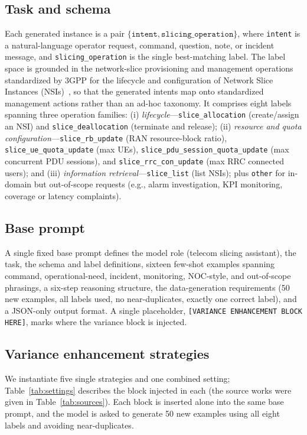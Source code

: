 \documentclass[conference]{IEEEtran}
\begin{document}
\subsection{Task and schema}
Each generated instance is a pair $\{\texttt{intent}, \texttt{slicing\_operation}\}$, where \texttt{intent} is a natural-language operator request, command, question, note, or incident message, and \texttt{slicing\_operation} is the single best-matching label. The label space is grounded in the network-slice provisioning and management operations standardized by 3GPP for the lifecycle and configuration of Network Slice Instances (NSIs)~\cite{3gpp28531}, so that the generated intents map onto standardized management actions rather than an ad-hoc taxonomy. It comprises eight labels spanning three operation families: (i) \emph{lifecycle}---\texttt{slice\_allocation} (create/assign an NSI) and \texttt{slice\_deallocation} (terminate and release); (ii) \emph{resource and quota configuration}---\texttt{slice\_rb\_update} (RAN resource-block ratio), \texttt{slice\_ue\_quota\_update} (max UEs), \texttt{slice\_pdu\_session\_quota\_update} (max concurrent PDU sessions), and \texttt{slice\_rrc\_con\_update} (max RRC connected users); and (iii) \emph{information retrieval}---\texttt{slice\_list} (list NSIs); plus \texttt{other} for in-domain but out-of-scope requests (e.g., alarm investigation, KPI monitoring, coverage or latency complaints).

\subsection{Base prompt}
A single fixed base prompt defines the model role (telecom slicing assistant), the task, the schema and label definitions, sixteen few-shot examples spanning command, operational-need, incident, monitoring, NOC-style, and out-of-scope phrasings, a six-step reasoning structure, the data-generation requirements (50 new examples, all labels used, no near-duplicates, exactly one correct label), and a JSON-only output format. A single placeholder, \texttt{[VARIANCE ENHANCEMENT BLOCK HERE]}, marks where the variance block is injected.

\subsection{Variance enhancement strategies}
We instantiate five single strategies and one combined setting; Table~\ref{tab:settings} describes the block injected in each (the source works were given in Table~\ref{tab:sources}). Each block is inserted alone into the same base prompt, and the model is asked to generate 50 new examples using all eight labels and avoiding near-duplicates.
\end{document}
